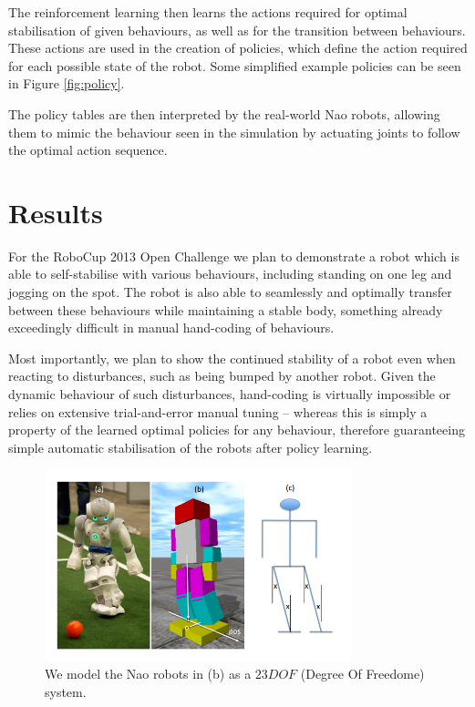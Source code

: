 The reinforcement learning then learns the actions required for optimal stabilisation of given behaviours, as well as for the transition between behaviours. These actions are used in the creation of policies, which define the action required for each possible state of the robot. Some simplified example policies can be seen in Figure \ref{fig:policy}.

The policy tables are then interpreted by the real-world Nao robots, allowing them to mimic the behaviour seen in the simulation by actuating joints to follow the optimal action sequence.

\section{Results}
For the RoboCup 2013 Open Challenge we plan to demonstrate a robot which is able to self-stabilise with various behaviours, including standing on one leg and jogging on the spot. The robot is also able to seamlessly and optimally transfer between these behaviours while maintaining a stable body, something already exceedingly difficult in manual hand-coding of behaviours.

Most importantly, we plan to show the continued stability of a robot even when reacting to disturbances, such as being bumped by another robot. Given the dynamic behaviour of such disturbances, hand-coding is virtually impossible or relies on extensive trial-and-error manual tuning -- whereas this is simply a property of the learned optimal policies for any behaviour, therefore guaranteeing simple automatic stabilisation of the robots after policy learning.

\begin{figure}[!t]
\centering
\includegraphics[width=3.5in]{img/RL_lean.png}
\caption{We model the Nao robots in (b) as a $23 DOF$ (Degree Of Freedome) system. \cite{bernhard_rl}}
\label{fig:lean}
\end{figure}


